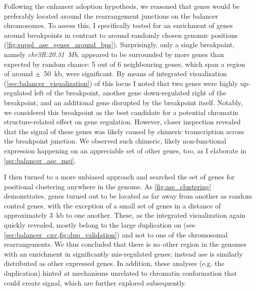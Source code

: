 Following the enhancer adoption hypothesis, we reasoned that \ase genes would
be preferably located around the rearrangement junctions on the balancer
chromosomes. To assess this, I specifically tested for an enrichment of \ase
genes around breakpoints in contrast to around randomly chosen genomic positions
(\cref{fig:suppl_ase_genes_around_bps}).
Surprisingly, only a single breakpoint, namely \textit{chr3R:20.31~Mb},
appeared to be surrounded by more \ase genes than expected by random chance: 5
out of 6 neighbouring genes, which span a region of around $\pm$~50~kb, were significant.
By means of integrated visualization (\cref{sec:balancer_visualization}) of this
locus I noted that two genes were highly up-regulated left of the breakpoint,
another gene down-regulated right of the breakpoint, and an additional gene
disrupted by the breakpoint itself. Notably, we considered this breakpoint as
the best candidate for a potential chromatin structure-related
effect on gene regulation. However, closer inspection revealed that the \ase signal of
these genes was likely caused by chimeric transcription across the breakpoint
junction. We observed such chimeric, likely non-functional expression happening
on an appreciable set of other genes, too, as I elaborate in
\cref{sec:balancer_ase_mei}.


I then turned to a more unbiased approach and searched the set of \ase
genes for positional clustering anywhere in the genome.
As \cref{fig:ase_clustering} demonstrates, \ase genes turned out to be located as
far away from another as random control genes, with the exception of
a small set of genes in a distance of approximately 3~kb to one another.
These, as the integrated visualization again quickly revealed, mostly belong to
the large duplication on \cyo (see \cref{sec:balancer_cnv,fig:dup_validation})
and not to one of the chromosomal rearrangements. We thus concluded that there
is no other region in the genomes with an enrichment in
significantly mis-regulated genes; instead \acl{ase} is similarly distributed
as other expressed genes. In addition, these analyses (e.g. the \cyo duplication) hinted at
mechanisms unrelated to chromatin conformation that could create \ase signal,
which are further explored subsequently.





